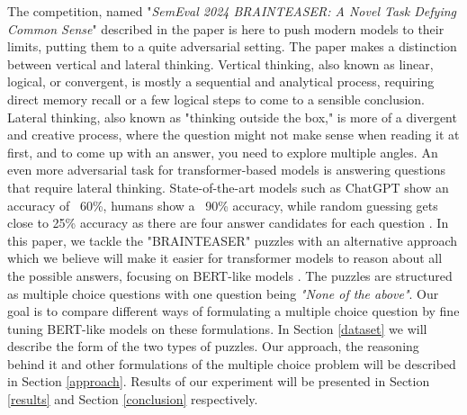 The competition, named "\textit{SemEval 2024 BRAINTEASER: A Novel Task Defying Common Sense}" described in the paper \citep{semeval} is here to push modern models to their limits, putting
them to a quite adversarial setting.
The paper makes a distinction between vertical and lateral thinking.
Vertical thinking, also known as linear, logical, or convergent, is mostly a sequential and analytical process, requiring direct memory recall or a few logical steps to come to a sensible conclusion.
Lateral thinking, also known as "thinking outside the box," is more of a divergent and creative process, where the question might not make sense when reading it at first, and to come up with an answer, you need to explore multiple angles.
An even more adversarial task for transformer-based models is answering questions that require lateral thinking. State-of-the-art models such as ChatGPT show an accuracy of ~60\%, humans show a ~90\% accuracy, while random guessing gets close to 25\% accuracy as there are four answer candidates for each question \citep{semeval}.
In this paper, we tackle the "BRAINTEASER" puzzles with an alternative approach which we believe will make it easier for transformer models to reason about all the possible answers, focusing on BERT-like models \cite{devlin}.
The puzzles are structured as multiple choice questions with one question being \emph{"None of the above"}.
Our goal is to compare different ways of formulating a multiple choice question by fine tuning BERT-like models on these formulations.
In Section \ref{dataset} we will describe the form of the two types of puzzles. 
Our approach, the reasoning behind it and other formulations of the multiple choice problem will be described in Section \ref{approach}.
Results of our experiment will be presented in Section \ref{results} and Section \ref{conclusion} respectively.